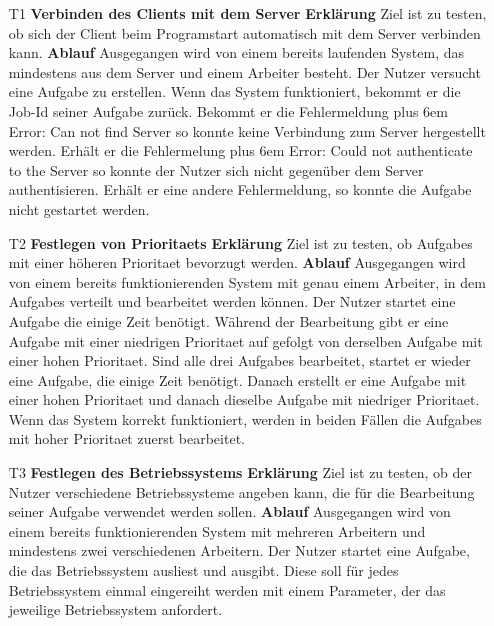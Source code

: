 \documentclass[a4paper,12pt]{article}
\makeatletter
\newenvironment{mycode}
 {\def\@xobeysp{\ }\verbatim\rightskip=0pt plus 6em\relax}
 {\endverbatim}
\makeatother
\begin{document}
\begin{itemize}
\item[T1] \textbf{Verbinden des \glspl{Client} mit dem \gls{Server}}
\subitem \textbf{Erklärung} Ziel ist zu testen, ob sich der \gls{Client} beim Programstart automatisch mit dem \gls{Server} verbinden kann.
\subitem \textbf{Ablauf} Ausgegangen wird von einem bereits laufenden System, das mindestens aus dem \gls{Server} und einem Arbeiter besteht.
Der Nutzer versucht eine \gls{Aufgabe} zu erstellen.
Wenn das System funktioniert, bekommt er die Job-Id seiner \gls{Aufgabe} zurück.
Bekommt er die Fehlermeldung
\begin{mycode}
Error: Can not find Server
\end{mycode}
so konnte keine Verbindung zum \gls{Server} hergestellt werden. Erhält er die Fehlermelung
\begin{mycode}
Error: Could not authenticate to the Server
\end{mycode}
so konnte der Nutzer sich nicht gegenüber dem \gls{Server} authentisieren. Erhält er eine andere Fehlermeldung, so konnte die \gls{Aufgabe} nicht gestartet werden.

\item[T2] \textbf{Festlegen von \glspl{Prioritaet} }
\subitem \textbf{Erklärung} Ziel ist zu testen, ob \glspl{Aufgabe} mit einer höheren \gls{Prioritaet} bevorzugt werden.
\subitem \textbf{Ablauf} Ausgegangen wird von einem bereits funktionierenden System mit genau einem Arbeiter, in dem \glspl{Aufgabe} verteilt und bearbeitet werden können.
Der Nutzer startet eine \gls{Aufgabe} die einige Zeit benötigt. Während der Bearbeitung gibt er eine \gls{Aufgabe} mit einer niedrigen \gls{Prioritaet} auf gefolgt von derselben \gls{Aufgabe} mit einer hohen \gls{Prioritaet}.
Sind alle drei \glspl{Aufgabe} bearbeitet, startet er wieder eine \gls{Aufgabe}, die einige Zeit benötigt. Danach erstellt er eine \gls{Aufgabe} mit einer hohen \gls{Prioritaet} und danach dieselbe \gls{Aufgabe} mit niedriger \gls{Prioritaet}.
Wenn das System korrekt funktioniert, werden in beiden Fällen die \glspl{Aufgabe} mit hoher \gls{Prioritaet} zuerst bearbeitet.

\item[T3] \textbf{Festlegen des Betriebssystems}
\subitem \textbf{Erklärung} Ziel ist zu testen, ob der Nutzer verschiedene Betriebssysteme angeben kann, die für die Bearbeitung seiner \gls{Aufgabe} verwendet werden sollen.
\subitem \textbf{Ablauf} Ausgegangen wird von einem bereits funktionierenden System mit mehreren Arbeitern und mindestens zwei verschiedenen Arbeitern. Der Nutzer startet eine \gls{Aufgabe}, die das Betriebssystem ausliest und ausgibt. Diese soll für jedes Betriebssystem einmal eingereiht werden mit einem \gls{Parameter}, der das jeweilige Betriebssystem anfordert.


\end{itemize}
\end{document}
